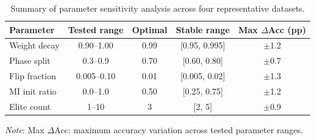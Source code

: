 \begin{table}[!htb]
\centering
\caption{Summary of parameter sensitivity analysis across four representative datasets.}
\label{T8}
\small
\setlength{\tabcolsep}{4pt}
\renewcommand{\arraystretch}{1.15}
\begin{tabular*}{\linewidth}{@{\extracolsep{\fill}}lcccc@{}}
\toprule
Parameter & Tested range & Optimal & Stable range & Max $\Delta$Acc (pp) \\
\midrule
Weight decay & 0.90--1.00 & 0.99 & [0.95, 0.995] & $\pm$1.2 \\
Phase split & 0.3--0.9 & 0.70 & [0.60, 0.80] & $\pm$0.7 \\
Flip fraction & 0.005--0.10 & 0.01 & [0.005, 0.02] & $\pm$1.3 \\
MI init ratio & 0.0--1.0 & 0.50 & [0.25, 0.75] & $\pm$1.2 \\
Elite count & 1--10 & 3 & [2, 5] & $\pm$0.9 \\
\bottomrule
\end{tabular*}
\vspace{2pt}
\par\raggedright\footnotesize
\textit{Note}: Max $\Delta$Acc: maximum accuracy variation across tested parameter ranges.
\end{table}

